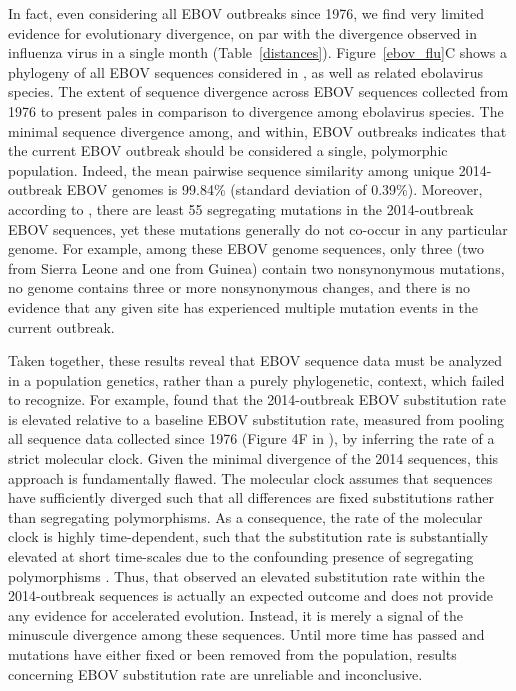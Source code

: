 \documentclass[11pt]{article}
\begin{document}
In fact, even considering all EBOV outbreaks since 1976, we find very limited evidence for evolutionary divergence, on par with the divergence observed in influenza virus in a single month (Table~\ref{distances}). Figure~\ref{ebov_flu}C shows a phylogeny of all EBOV sequences considered in \citet{Gire2014}, as well as related ebolavirus species. The extent of sequence divergence across EBOV sequences collected from 1976 to present pales in comparison to divergence among ebolavirus species. The minimal sequence divergence among, and within, EBOV outbreaks indicates that the current EBOV outbreak should be considered a single, polymorphic population. Indeed, the mean pairwise sequence similarity among unique 2014-outbreak EBOV genomes is 99.84\% (standard deviation of 0.39\%). Moreover, according to \citet{Gire2014}, there are least 55 segregating mutations in the 2014-outbreak EBOV sequences, yet these mutations generally do not co-occur in any particular genome. For example, among these EBOV genome sequences, only three (two from Sierra Leone and one from Guinea) contain two nonsynonymous mutations, no genome contains three or more nonsynonymous changes, and there is no evidence that any given site has experienced multiple mutation events in the current outbreak.  

Taken together, these results reveal that EBOV sequence data must be analyzed in a population genetics, rather than a purely phylogenetic, context, which \citet{Gire2014} failed to recognize. For example, \citet{Gire2014} found that the 2014-outbreak EBOV substitution rate is elevated relative to a baseline EBOV substitution rate, measured from pooling all sequence data collected since 1976 (Figure 4F in \citealt{Gire2014}), by inferring the rate of a strict molecular clock. Given the minimal divergence of the 2014 sequences, this approach is fundamentally flawed. The molecular clock assumes that sequences have sufficiently diverged such that all differences are fixed substitutions rather than segregating polymorphisms. As a consequence, the rate of the molecular clock is highly time-dependent, such that the substitution rate is substantially elevated at short time-scales due to the confounding presence of segregating polymorphisms \citep{Hoetal2005, Hoetal2007, PetersonMasel2009, Hoetal2011}. Thus, that \citet{Gire2014} observed an elevated substitution rate within the 2014-outbreak sequences is actually an expected outcome and does not provide any evidence for accelerated evolution. Instead, it is merely a signal of the minuscule divergence among these sequences. Until more time has passed and mutations have either fixed or been removed from the population, results concerning EBOV substitution rate are unreliable and inconclusive.
\end{document}
